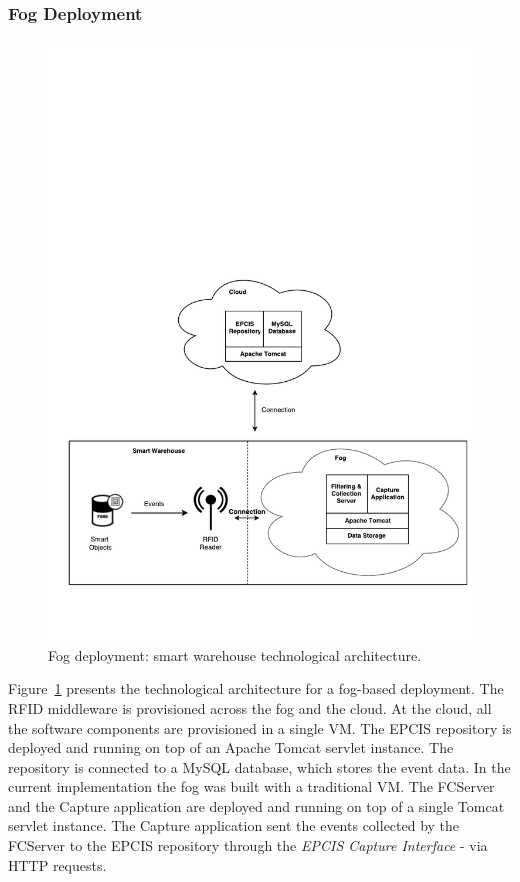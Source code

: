 \subsubsection{Fog Deployment}
\label{subs:imp_smart_warehouse_fog}

\begin{figure}[ht!]
\centering
\includegraphics[width=\textwidth]{./images/implementation_fog_architecture}
\caption[Fog deployment: technological architecture.]{Fog deployment: smart warehouse technological architecture.}
\label{fig:implementation_fog_architecture}
\end{figure}

Figure~\ref{fig:implementation_fog_architecture} presents the technological architecture for a fog-based
deployment. The \gls{RFID} middleware is provisioned across the fog and the cloud. At the cloud,
all the software components are provisioned in a single \gls{VM}. The \gls{EPCIS} repository is deployed
and running on top of an Apache Tomcat servlet instance. The repository is connected to a MySQL
database, which stores the event data. In the current implementation the fog was built with a traditional
\gls{VM}. The \gls{FCServer} and the Capture application are deployed and running on top of a single
Tomcat servlet instance. The Capture application sent the events collected by the \gls{FCServer} to
the \gls{EPCIS} repository through the \textit{\gls{EPCIS} Capture Interface} - via \gls{HTTP} requests.\\

